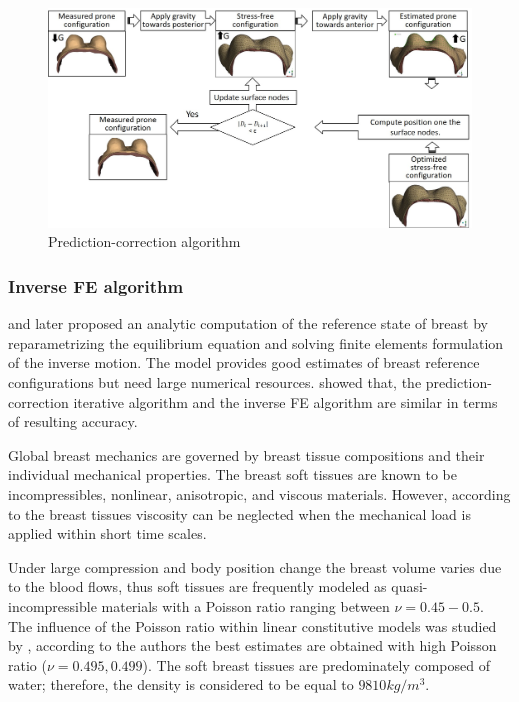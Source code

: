 \begin{figure}[!h]
\centering
\includegraphics[width=1\textwidth,keepaspectratio]{figures/prediction-correction.jpg} 
\caption{Prediction-correction algorithm}\label{predictioncorectionalgo}
\end{figure}


 \subsubsection*{Inverse FE algorithm}
\cite{pathmanathan_predicting_2008} and later \cite{vavourakis_inverse_2016} proposed an analytic computation of the reference state of breast by reparametrizing the equilibrium equation and solving finite elements formulation of the inverse motion. The model provides good estimates of breast reference configurations but need large numerical resources. \cite{eiben_breast_2014} showed that, the prediction-correction iterative algorithm and the inverse FE algorithm are similar in terms of resulting accuracy. 


Global breast mechanics are governed by breast tissue compositions and their individual mechanical properties. The breast soft tissues are known to be incompressibles, nonlinear, anisotropic, and viscous materials. However, according to \cite{wellman_breast_1999} the breast tissues viscosity can be neglected when the mechanical load is applied within short time scales.  

Under large compression and body position change the breast volume varies due to the blood flows, thus soft tissues are frequently modeled as quasi-incompressible materials with a Poisson ratio ranging between $\nu = {0.45-0.5}$. The influence of the Poisson ratio within linear constitutive models was studied by \cite{tanner_factors_2006}, according to the authors the best estimates are obtained with high Poisson ratio ($\nu = {0.495,0.499}$). The soft breast tissues are predominately composed of water; therefore, the density is considered to be equal to $9810 kg/m^3$.  


